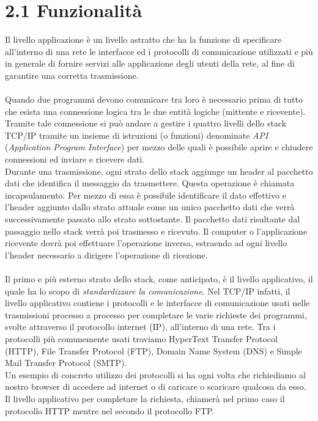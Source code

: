 \documentclass[a4paper, 11pt, oneside]{book}
\theoremstyle{plain}
\begin{document}
\section*{2.1 Funzionalità}
Il livello applicazione è un livello astratto che ha la funzione di specificare all'interno di una rete le interfacce ed i protocolli di comunicazione utilizzati e più in generale di fornire servizi alle applicazione degli utenti della rete, al fine di garantire una corretta trasmissione.\\\\
Quando due programmi devono comunicare tra loro è necessario prima di tutto che esista una connessione logica tra le due entità logiche (mittente e ricevente). Tramite tale connessione si può andare a gestire i quattro livelli dello stack TCP/IP tramite un insieme di istruzioni (o funzioni) denominate \textit{API} (\textit{Application Program Interface}) per mezzo delle quali è possibile aprire e chiudere connessioni ed inviare e ricevere dati. \\Durante una trasmissione, ogni strato dello stack aggiunge un header al pacchetto dati che identifica il messaggio da trasmettere. Questa operazione è chiamata incapsulamento. Per mezzo di essa è possibile identificare il dato effettivo e l'header aggiunto dallo strato attuale come un unico pacchetto dati che verrà successivamente passato allo strato sottostante. Il pacchetto dati risultante dal passaggio nello stack verrà poi trasmesso e ricevuto. Il computer o l'applicazione ricevente dovrà poi effettuare  l'operazione inversa, estraendo ad ogni livello l'header necessario a dirigere l'operazione di ricezione.
\\\\Il primo e più esterno strato dello stack, come anticipato, è il livello applicativo, il quale ha lo scopo di \textit{standardizzare la comunicazione}. Nel TCP/IP infatti, il livello applicativo contiene i protocolli e le interfacce di comunicazione usati nelle trasmissioni processo a processo per completare le varie richieste dei programmi, svolte attraverso il protocollo internet (IP), all'interno di una rete. Tra i protocolli più comunemente usati troviamo HyperText Transfer Protocol (HTTP), File Transfer Protocol (FTP), Domain Name System (DNS) e Simple Mail Transfer Protocol (SMTP).\\
Un esempio di concreto utilizzo dei protocolli si ha ogni volta che richiediamo al nostro browser di accedere ad internet o di caricare o scaricare qualcosa da esso. Il livello applicativo per completare la richiesta, chiamerà nel primo caso il protocollo HTTP mentre nel secondo il protocollo FTP.\\
\end{document}
